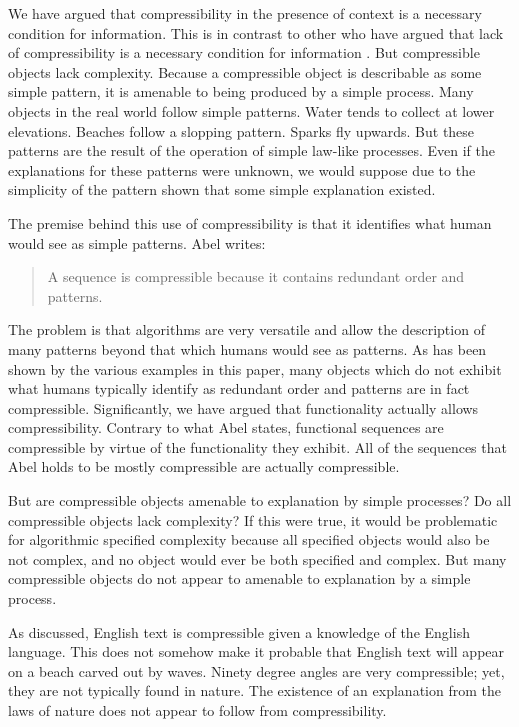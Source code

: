 We have argued that compressibility in the presence of context is a necessary condition for information.
This is in contrast to other who have argued that lack of compressibility is a necessary condition for information \cite{Abel2005}.
But compressible objects lack complexity.
Because a compressible object is describable as some simple pattern, it is amenable to being produced by a simple process.
Many objects in the real world follow simple patterns.
Water tends to collect at lower elevations.
Beaches follow a slopping pattern.
Sparks fly upwards.
But these patterns are the result of the operation of simple law-like processes.
Even if the explanations for these patterns were unknown, we would suppose due to the simplicity of the pattern shown that some simple explanation existed.

The premise behind this use of compressibility is that it identifies what human would see as simple patterns.
Abel writes:
\begin{quotation}
    A sequence is compressible because it contains redundant order and patterns. \cite{Abel2005}
\end{quotation}
The problem is that algorithms are very versatile and allow the description of many patterns beyond that which humans would see as patterns.
As has been shown by the various examples in this paper, many objects which do not exhibit what humans typically identify as redundant order and patterns are in fact compressible.
Significantly, we have argued that functionality actually allows compressibility.
Contrary to what Abel states, functional sequences are compressible by virtue of the functionality they exhibit.
All of the sequences that Abel holds to be mostly compressible are actually compressible.

But are compressible objects amenable to explanation by simple processes?
Do all compressible objects lack complexity?
If this were true, it would be problematic for algorithmic specified complexity because all specified objects would also be not complex, and no object would ever be both specified and complex.
But many compressible objects do not appear to amenable to explanation by a simple process.

As discussed, English text is compressible given a knowledge of the English language.
This does not somehow make it probable that English text will appear on a beach carved out by waves.
Ninety degree angles are very compressible; yet, they are not typically found in nature.
The existence of an explanation from the laws of nature does not appear to follow from compressibility.

